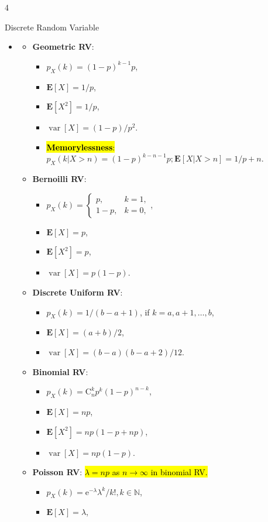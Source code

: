 \documentclass[landscape,a4paper]{article}
\renewcommand{\emph}[1]{\hl{#1}}
\newcommand{\e}{\mathrm{e}}
\newcommand{\C}[2]{\mathrm{C}_{#1}^{#2}}
\newcommand{\EE}{\mathbf{E}}
\newcommand{\var}{\operatorname{var}}
\begin{document}
\begin{multicols*}{4}
\begin{card}{Discrete Random Variable}
\begin{itemize}
				\item \begin{itemize}
					\item \textbf{Geometric RV}:
					\begin{itemize}
						\item $p_X(k)=(1-p)^{k-1}p$,
						\item $\EE[X]=1/p$,
						\item $\EE[X^2]=1/p$,
						\item $\var[X]=(1-p)/p^2$.
						\item \emph{\textbf{Memorylessness}:}\\ $p_X(k|X>n)=(1-p)^{k-n-1}p;\EE[X|X > n]=1/p + n$.
					\end{itemize}
					\item \textbf{Bernoilli RV}:
					\begin{itemize}
						\item $p_X(k)=\begin{cases}p,&k=1,\\1-p,&k=0,\end{cases}$,
						\item $\EE[X]=p$,
						\item $\EE[X^2]=p$,
						\item $\var[X]=p(1-p)$.
					\end{itemize}
					\item \textbf{Discrete Uniform RV}:
					\begin{itemize}
						\item $p_X(k)=1/(b-a+1)$, if $k=a,a+1,\dots,b$,
						\item $\EE[X]=(a+b)/2$,
						\item $\var[X]=(b-a)(b-a+2)/12$.
					\end{itemize}
					\item \textbf{Binomial RV}:
					\begin{itemize}
						\item $p_X(k)=\C{n}{k}p^k(1-p)^{n-k}$,
						\item $\EE[X]=np$,
						\item $\EE[X^2]=np(1-p+np)$,
						\item $\var[X]=np(1-p)$.
					\end{itemize}
					\item \textbf{Poisson RV}: \emph{$\lambda=np$ as $n\to\infty$ in binomial RV.}
					\begin{itemize}
						\item $p_X(k)=\e^{-\lambda}\lambda^k/k!,k\in\mathbb N$,
						\item $\EE[X]=\lambda$,

\end{itemize}
\end{itemize}
\end{itemize}
\end{card}
\end{multicols*}
\end{document}
